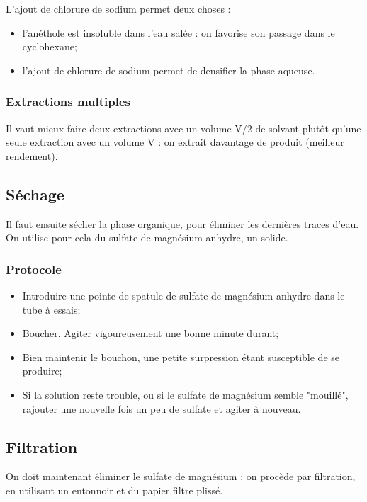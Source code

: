\documentclass[11pt,a4paper]{report}
\begin{document}
L'ajout de chlorure de sodium permet deux choses :
\begin{itemize}
	\item l'anéthole est insoluble dans l'eau salée : on favorise son passage dans le cyclohexane;
	\item l'ajout de chlorure de sodium permet de densifier la phase aqueuse.
\end{itemize}

\subsubsection*{Extractions multiples}

Il vaut mieux faire deux extractions avec un volume V/2 de solvant plutôt qu'une seule extraction avec un volume V : on extrait davantage de produit (meilleur rendement).

\subsection{Séchage}

Il faut ensuite sécher la phase organique, pour éliminer les dernières traces d'eau. On utilise pour cela du sulfate de magnésium anhydre, un solide.

\subsubsection*{Protocole}
\begin{itemize}
	\item Introduire une pointe de spatule de sulfate de magnésium anhydre dans le tube à essais;
	\item Boucher. Agiter vigoureusement une bonne minute durant;
	\item Bien maintenir le bouchon, une petite surpression étant susceptible de se produire;
	\item Si la solution reste trouble, ou si le sulfate de magnésium semble "mouillé", 
	rajouter une nouvelle fois un peu de sulfate et agiter à nouveau. 
\end{itemize}

\subsection{Filtration}

On doit maintenant éliminer le sulfate de magnésium : on procède par filtration, en utilisant un entonnoir et du papier filtre plissé.
\end{document}
